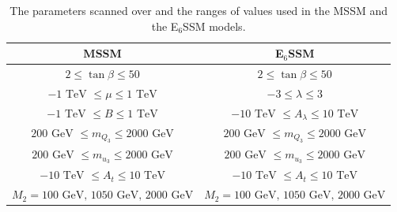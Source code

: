 \documentclass[preprint,amsmath,amssymb,aps,superscriptaddress,prd,showpacs,floatfix,nofootinbib]{revtex4-1}
\begin{document}
\begin{table}[h]
\centering
\begin{ruledtabular}
\begin{tabular}{cc}
MSSM & E$_6$SSM \\
\hline
$2 \leq \tan\beta \leq 50$& $2 \leq \tan\beta \leq 50$ \\
$-1\textrm{ TeV } \leq \mu \leq 1 \textrm{ TeV}$ & $-3 \leq \lambda \leq 3$\\
$-1\textrm{ TeV } \leq B \leq 1\textrm{ TeV}$ & $-10\textrm{ TeV } \leq A_\lambda \leq 10\textrm{ TeV}$ \\
$ 200 \textrm{ GeV } \leq m_{Q_3} \leq 2000 \textrm { GeV}$ & $ 200 \textrm{ GeV } \leq m_{Q_3} \leq 2000 \textrm { GeV}$\\
$ 200 \textrm{ GeV } \leq m_{u_3} \leq 2000 \textrm { GeV}$ & $ 200 \textrm{ GeV } \leq m_{u_3} \leq 2000 \textrm { GeV}$\\
$ -10 \textrm{ TeV } \leq A_t \leq 10 \textrm { TeV}$ & $ -10 \textrm{ TeV } \leq A_t \leq 10 \textrm { TeV}$\\
$M_2=100\textrm{ GeV, } 1050\textrm{ GeV, } 2000 \textrm{ GeV}$ & $M_2=100\textrm{ GeV, } 1050\textrm{ GeV, } 2000 \textrm{ GeV}$ \\
\end{tabular}
\end{ruledtabular}
\caption{The parameters scanned over and the ranges of values used in
  the MSSM and the E$_6$SSM models.}
\label{tab:scanranges}
\end{table}
\end{document}
